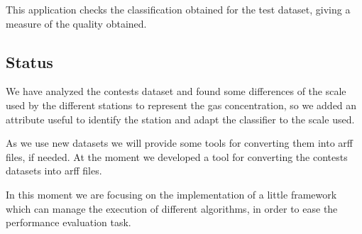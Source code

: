 \documentclass[12pt,a4paper]{article}
\begin{document}
This application checks the classification obtained for the test dataset,
giving a measure of the quality obtained.

\subsection*{Status}
We have analyzed the contests dataset and found some differences of the
scale used by the different stations to represent the gas concentration,
so we added an attribute useful to identify the station and adapt the
classifier to the scale used.

As we use new datasets we will provide some tools for converting them into
arff files, if needed. At the moment we developed a tool for converting
the contests datasets into arff files.

In this moment we are focusing on the implementation of a little framework
which can manage the execution of different algorithms, in order to ease
the performance evaluation task.
\end{document}
